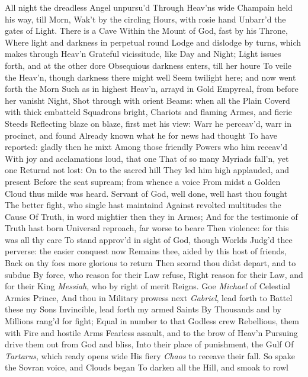 \documentclass[11pt]{book}
\newcounter {first}
\begin{document}
All night the dreadless Angel unpursu'd 
Through Heav'ns wide Champain held his way, till Morn, 
Wak't by the circling Hours, with rosie hand 
Unbarr'd the gates of Light.  There is a Cave 
Within the Mount of God, fast by his Throne, 
Where light and darkness in perpetual round 
Lodge and dislodge by turns, which makes through Heav'n 
Grateful vicissitude, like Day and Night; 
Light issues forth, and at the other dore 
Obsequious darkness enters, till her houre 
To veile the Heav'n, though darkness there might well 
Seem twilight here; and now went forth the Morn 
Such as in highest Heav'n, arrayd in Gold 
Empyreal, from before her vanisht Night, 
Shot through with orient Beams: when all the Plain 
Coverd with thick embatteld Squadrons bright, 
Chariots and flaming Armes, and fierie Steeds 
Reflecting blaze on blaze, first met his view: 
Warr he perceav'd, warr in procinct, and found 
Already known what he for news had thought 
To have reported: gladly then he mixt 
Among those friendly Powers who him receav'd 
With joy and acclamations loud, that one 
That of so many Myriads fall'n, yet one 
Returnd not lost: On to the sacred hill 
They led him high applauded, and present 
Before the seat supream; from whence a voice 
From midst a Golden Cloud thus milde was heard. 
\quad Servant of God, well done, well hast thou fought 
The better fight, who single hast maintaind 
Against revolted multitudes the Cause 
Of Truth, in word mightier then they in Armes; 
And for the testimonie of Truth hast born 
Universal reproach, far worse to beare 
Then violence: for this was all thy care 
To stand approv'd in sight of God, though Worlds 
Judg'd thee perverse: the easier conquest now 
Remains thee, aided by this host of friends, 
Back on thy foes more glorious to return 
Then scornd thou didst depart, and to subdue 
By force, who reason for their Law refuse, 
Right reason for their Law, and for their King 
\textit{Messiah}, who by right of merit Reigns. 
Goe \textit{Michael} of Celestial Armies Prince, 
And thou in Military prowess next 
\textit{Gabriel}, lead forth to Battel these my Sons 
Invincible, lead forth my armed Saints 
By Thousands and by Millions rang'd for fight; 
Equal in number to that Godless crew 
Rebellious, them with Fire and hostile Arms 
Fearless assault, and to the brow of Heav'n 
Pursuing drive them out from God and bliss, 
Into their place of punishment, the Gulf 
Of \textit{Tartarus}, which ready opens wide 
His fiery \textit{Chaos} to receave their fall. 
\quad So spake the Sovran voice, and Clouds began 
To darken all the Hill, and smoak to rowl 
\end{document}
